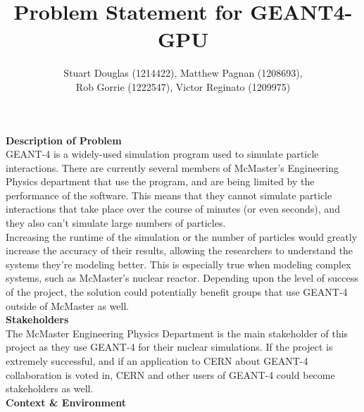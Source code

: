 \documentclass[12pt]{article}
\begin{document}
\title{\vspace{-4em}Problem Statement for GEANT4-GPU} \author{Stuart Douglas
(1214422), Matthew Pagnan (1208693), \\ Rob Gorrie (1222547), Victor Reginato
(1209975)}
	
\maketitle


\noindent \textbf{Description of Problem}\\ GEANT-4 is a widely-used simulation
program used to simulate particle interactions. There are currently several
members of McMaster's Engineering Physics department that use the program, and
are being limited by the performance of the software. This means that they
cannot simulate particle interactions that take place over the course of minutes
(or even seconds), and they also can't simulate large numbers of particles.\\

\noindent Increasing the runtime of the simulation or the number of particles
would greatly increase the accuracy of their results, allowing the researchers
to understand the systems they're modeling better. This is especially true when
modeling complex systems, such as McMaster's nuclear reactor. Depending upon the
level of success of the project, the solution could potentially benefit groups
that use GEANT-4 outside of McMaster as well.\\

\noindent \textbf{Stakeholders}\\ The McMaster Engineering Physics Department is
the main stakeholder of this project as they use GEANT-4 for their nuclear
simulations. If the project is extremely successful, and if an
application to CERN about GEANT-4 collaboration is voted in, CERN and other
users of GEANT-4 could become stakeholders as well.\\

\noindent \textbf{Context \& Environment}\\ \\ 
\end{document}

